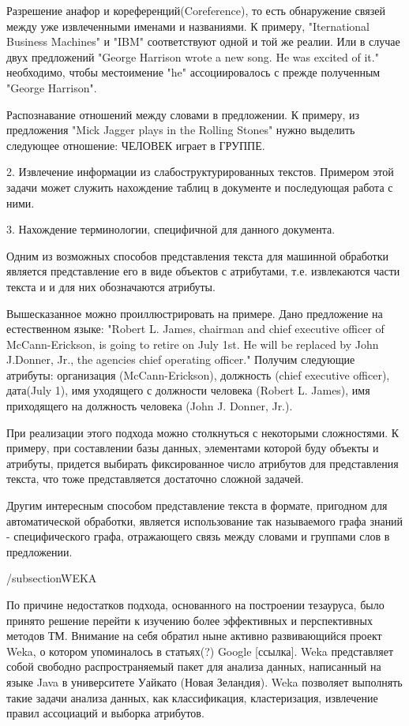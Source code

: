    Разрешение анафор и кореференций(Coreference), то есть обнаружение связей между уже
   извлеченными именами и названиями. К примеру, "Iternational Business Machines"
   и "IBM" соответствуют одной и той же реалии. Или в случае двух предложений
   "George Harrison wrote a new song. He was excited of it." необходимо, чтобы
   местоимение "he" ассоциировалось с прежде полученным "George Harrison".
   
   Распознавание отношений между словами в предложении. К примеру, из предложения
   "Mick Jagger plays in the Rolling Stones" нужно выделить следующее отношение:
   ЧЕЛОВЕК играет в ГРУППЕ.
   
2. Извлечение информации из слабоструктурированных текстов. 
   Примером этой задачи может служить нахождение таблиц в документе и последующая
   работа с ними.
   
3. Нахождение терминологии, специфичной для данного документа.

Одним из возможных способов представления текста для машинной обработки является
представление его в виде объектов с атрибутами, т.е. извлекаются части текста и 
и для них обозначаются атрибуты.

Вышесказанное можно проиллюстрировать на примере. Дано предложение на 
естественном языке: "Robert L. James, chairman and chief executive
officer of McCann-Erickson, is going to retire on July 1st.  He will
be replaced by John J.Donner, Jr., the agencies chief operating
officer."  Получим следующие атрибуты: организация (McCann-Erickson),
должность (chief executive officer), дата(July 1), имя уходящего с
должности человека (Robert L. James), имя приходящего на должность
человека (John J. Donner, Jr.).

При реализации этого подхода можно столкнуться с некоторыми сложностями. 
К примеру, при составлении базы данных, элементами которой буду объекты и
атрибуты, придется выбирать фиксированное число атрибутов для представления
текста, что тоже представляется достаточно сложной задачей.

Другим интересным способом представление текста в формате, пригодном для
автоматической обработки, является использование так называемого графа знаний - 
специфического графа, отражающего связь между словами и группами слов в предложении.

/subsection{WEKA}

По причине недостатков подхода, основанного на построении тезауруса, было принято решение перейти к 
изучению более эффективных и перспективных методов ТМ. Внимание на себя обратил ныне активно
развивающийся проект Weka, о котором упоминалось в статьях(?) Google [ссылка].
Weka представляет собой свободно распространяемый пакет для анализа данных, 
написанный на языке Java в университете Уайкато (Новая Зеландия). Weka позволяет 
выполнять такие задачи анализа данных, как классификация, кластеризация, извлечение 
правил ассоциаций и выборка атрибутов. 


